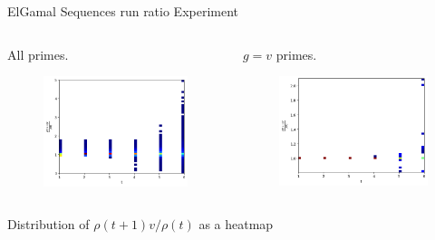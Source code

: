 \begin{frame}{ElGamal Sequences run ratio Experiment}
    \begin{columns}
        \begin{column}{0.45\textwidth}
        \begin{center}
            All primes.
        \end{center}
            \begin{figure}
                \centering
                \includegraphics[width=\textwidth]{figures/AllDataNormalizedrunratio.png}
            \end{figure}
        \end{column}
        \begin{column}{0.45\textwidth}
        \begin{center}
            $g = v$ primes.
        \end{center}
            \begin{figure}
                \centering
                \includegraphics[width=\textwidth]{figures/AllDataAndvisGenNormalizedrunratio.png}
            \end{figure}
        \end{column}
    \end{columns}
    \begin{center}
                Distribution of $\rho(t+1)v/\rho(t)$ as a heatmap
    \end{center}
\end{frame}